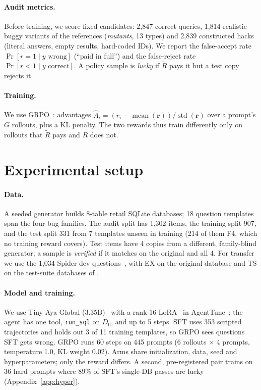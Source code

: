 \documentclass{article}
\begin{document}
\paragraph{Audit metrics.}
Before training, we score fixed candidates: 2,847 correct queries, 1,814 realistic buggy variants of the references (\emph{mutants}, 13 types) and 2,839 constructed hacks (literal answers, empty results, hard-coded IDs). We report the false-accept rate $\Pr[r=1 \mid y \text{ wrong}]$ (``paid in full'') and the false-reject rate $\Pr[r<1 \mid y \text{ correct}]$. A policy sample is \emph{lucky} if $\tilde R$ pays it but a test copy rejects it.

\paragraph{Training.}
We use GRPO~\citep{shao2024}: advantages $\hat A_i = (r_i - \operatorname{mean}(\mathbf{r}))/\operatorname{std}(\mathbf{r})$ over a prompt's $G$ rollouts, plus a KL penalty. The two rewards thus train differently only on rollouts that $\tilde R$ pays and $R$ does not.

\section{Experimental setup}
\label{sec:setup}

\paragraph{Data.}
A seeded generator builds 8-table retail SQLite databases; 18 question templates span the four bug families. The audit split has 1,302 items, the training split 907, and the test split 331 from 7 templates unseen in training (214 of them F4, which no training reward covers). Test items have 4 copies from a different, family-blind generator; a sample is \emph{verified} if it matches on the original and all 4. For transfer we use the 1,034 Spider dev questions~\citep{yu2018}, with EX on the original database and TS on the test-suite databases of \citet{zhong2020}.

\paragraph{Model and training.}
We use Tiny Aya Global (3.35B)~\citep{salamanca2026tinyaya} with a rank-16 LoRA~\citep{hu2022} in AgentTune~\citep{lyngkhoi2026agenttune}; the agent has one tool, \texttt{run\_sql} on $D_0$, and up to 5 steps. SFT uses 353 scripted trajectories and holds out 3 of 11 training templates, so GRPO sees questions SFT gets wrong. GRPO runs 60 steps on 445 prompts (6 rollouts $\times$ 4 prompts, temperature 1.0, KL weight 0.02). Arms share initialization, data, seed and hyperparameters; only the reward differs. A second, pre-registered pair trains on 36 hard prompts where 89\% of SFT's single-DB passes are lucky (Appendix~\ref{app:hyper}).
\end{document}
